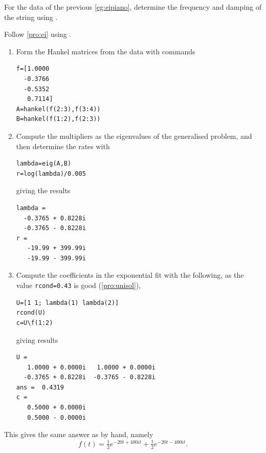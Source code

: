 \begin{example} \label{eg:eipianu}
For the data of the previous \autoref{eg:eipiano}, determine the frequency and damping of the string using \script.

\begin{solution} 
Follow \autoref{pro:ei} using \script. 
\begin{enumerate}
\item Form the Hankel matrices from the data with commands
\begin{verbatim}
f=[1.0000
  -0.3766
  -0.5352
   0.7114]
A=hankel(f(2:3),f(3:4))
B=hankel(f(1:2),f(2:3))
\end{verbatim}
\setbox\ajrqrbox\hbox{}%
\marginpar{\usebox{\ajrqrbox}}%

\item Compute the multipliers as the eigenvalues of the generalised problem, and then determine the rates with
\begin{verbatim}
lambda=eig(A,B)
r=log(lambda)/0.005
\end{verbatim}
giving the results
\begin{verbatim}
lambda =
  -0.3765 + 0.8228i
  -0.3765 - 0.8228i
r =
   -19.99 + 399.99i
   -19.99 - 399.99i
\end{verbatim}


\item Compute the coefficients in the exponential fit with the following, as the value \verb|rcond=0.43| is good (\autoref{pro:unisol}),
\begin{verbatim}
U=[1 1; lambda(1) lambda(2)]
rcond(U)
c=U\f(1:2)
\end{verbatim}
giving results
\begin{verbatim}
U =
   1.0000 + 0.0000i   1.0000 + 0.0000i
  -0.3765 + 0.8228i  -0.3765 - 0.8228i
ans =  0.4319
c =
   0.5000 + 0.0000i
   0.5000 - 0.0000i
\end{verbatim}
\end{enumerate}
This gives the same answer as by hand, namely 
\begin{equation*}
f(t)=\tfrac12e^{-20t+400it}+\tfrac12e^{-20t-400it}.
\end{equation*}
\end{solution}
\end{example}




